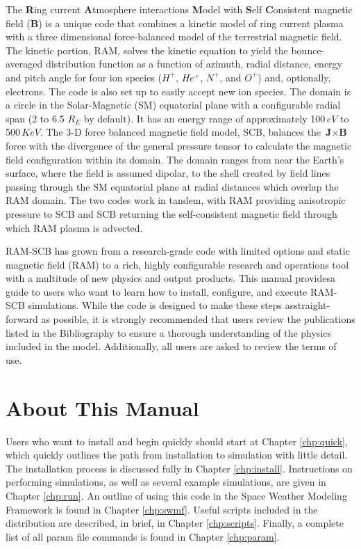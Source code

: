 The \textbf{R}ing current \textbf{A}tmosphere interactions \textbf{M}odel with \textbf{S}elf \textbf{C}onsistent magnetic field (\textbf{B}) is a unique code that combines a kinetic model of ring current plasma with a three dimensional force-balanced model of the terrestrial magnetic field.  The kinetic portion, RAM, solves the kinetic equation to yield the bounce-averaged distribution function as a function of azimuth, radial distance, energy and pitch angle for four ion species ($H^{+}$, $He^{+}$, $N^{+}$, and $O^{+}$) and, optionally, electrons. The code is also set up to easily accept new ion species. The domain is a circle in the Solar-Magnetic (SM) equatorial plane with a configurable radial span (2 to 6.5 $R_{E}$ by default).  It has an energy range of approximately 100\,$eV$ to 500\,$KeV$.  The 3-D force balanced magnetic field model, SCB, balances the $\textbf{J} \times \textbf{B}$ force with the divergence of the general pressure tensor to calculate the magnetic field configuration within its domain.  The domain ranges from near the Earth's surface, where the field is assumed dipolar, to the shell created by field lines passing through the SM equatorial plane at radial distances which overlap the RAM domain.  The two codes work in tandem, with RAM providing anisotropic pressure to SCB and SCB returning the self-consistent magnetic field through which RAM plasma is advected.

RAM-SCB has grown from a research-grade code with limited options and static magnetic field (RAM) to a rich, highly configurable research and operations tool with a multitude of new physics and output products.  This manual providesa guide to users who want to learn how to install, configure, and execute RAM-SCB simulations.  While the code is designed to make these steps asstraight-forward as possible, it is strongly recommended that users review the publications listed in the Bibliography to ensure a thorough understanding of the physics included in the model.  Additionally, all users are asked to review the terms of use.

\section{About This Manual}
Users who want to install and begin quickly should start at Chapter \ref{chp:quick}, which quickly outlines the path from installation to simulation with little detail.  The installation process is discussed fully in Chapter \ref{chp:install}.  Instructions on performing simulations, as well as several example simulations, are given in Chapter \ref{chp:run}. An outline of using this code in the Space Weather Modeling Framework is found in Chapter \ref{chp:swmf}. Useful scripts included in the distribution are described, in brief, in Chapter \ref{chp:scripts}. Finally, a complete list of all param file commands is found in Chapter \ref{chp:param}.


